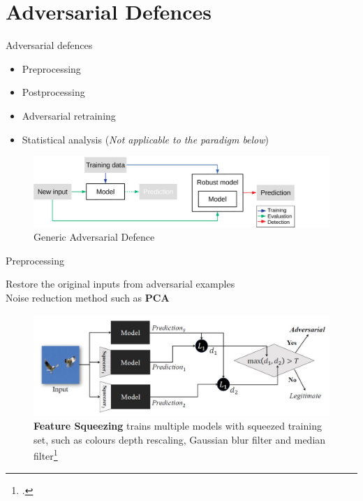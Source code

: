 \documentclass[9pt]{beamer}
\begin{document}
\section{Adversarial Defences}

\begin{frame}{Adversarial defences}
\label{defence}

\begin{itemize}
    \item Preprocessing
    \item Postprocessing
    \item Adversarial retraining
    \item Statistical analysis (\textit{Not applicable to the paradigm below})
\end{itemize}

\begin{figure}
    \centering
    \small
    \includegraphics[width=\linewidth]{images/generic-defence.pdf}
    \caption{Generic Adversarial Defence}
    \label{fig:defence}
\end{figure}

\hyperlink{blackbox_defence}{}
\end{frame}

\begin{frame}{Preprocessing}
\label{preprocessing}

Restore the original inputs from adversarial examples\\
Noise reduction method such as \textbf{PCA}
\begin{examples}
    \begin{figure}
        \centering
        \small
        \includegraphics[width=0.8\linewidth]{images/feature_squeezing.jpg}
        \caption{\textbf{Feature Squeezing} trains multiple models with squeezed training set, such as colours depth rescaling, Gaussian blur filter and median filter\footcite{xu2017feature}}
    \end{figure}
\end{examples}

\hyperlink{adv_examples}{}
\end{frame}
\end{document}
